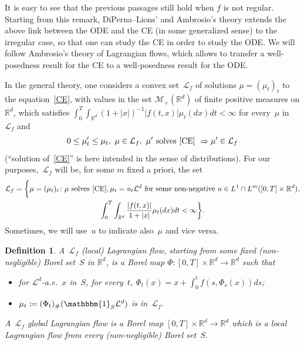 \documentclass[a4paper,10pt]{article}
\newtheorem{definition}[theorem]{Definition}
\newcommand\1{\mathbbm{1}}
\newcommand{\mc}{\mathcal}
\numberwithin{equation}{section}
\begin{document}
It is easy to see that the previous passages still hold when $f$ is not regular. Starting from this remark, DiPerna--Lions' and Ambrosio's theory extends the above link between the ODE and the CE (in some generalized sense) to the irregular case, so that one can study the CE in order to study the ODE. We will follow Ambrosio's theory of Lagrangian flows, which allows to transfer a well-posedness result for the CE to a well-posedness result for the ODE.

In the general theory, one considers a convex set~$\mc{L}_f$ of solutions $\mu=(\mu_t)_t$ to the equation~\eqref{CE}, with values in the set $\mc{M}_+(\mathbb{R}^d)$ of finite positive measures on $\mathbb{R}^d$, which satisfies $\int^T_0\int_{\mathbb{R}^d} (1+|x|)^{-1} |f(t,x)| \mu_t(dx)dt< \infty$ for every~$\mu$ in~$\mc{L}_f$ and
\begin{equation}
0\le\mu'_t\le\mu_t,\ \mu\in\mc{L}_f,\ \mu'\mbox{ solves~\eqref{CE} }\Rightarrow\mu'\in\mc{L}_f\label{condLb}
\end{equation}
(``solution of~\eqref{CE}'' is here intended in the sense of distributions). For our purposes,~$\mc{L}_f$ will be, for some $m$ fixed a priori, the set
\begin{multline*}
\mc{L}_f=\bigg\{\mu=(\mu_t)_t \colon \mu\mbox{ solves~\eqref{CE}}, \mu_t=u_t\mc{L}^d \text{ for some non-negative } u\in L^1\cap L^m([0,T]\times\mathbb{R}^d), \\ \int^T_0\int_{\mathbb{R}^d}\frac{|f(t,x)|}{1+|x|}\mu_t(dx)dt< \infty \bigg\} .
\end{multline*}
Sometimes, we will use~$u$ to indicate also~$\mu$ and vice versa.

\begin{definition}
A~\emph{$\mc{L}_f$ \textup{(}local\textup{)} Lagrangian flow, starting from some fixed \textup{(}non-negligible\textup{)} Borel set~$S$ in $\mathbb{R}^d$}, is a Borel map $\Phi \colon [0,T]\times\mathbb{R}^d\rightarrow\mathbb{R}^d$ such that
\begin{itemize}
\item for $\mc{L}^d$-a.e.~$x$ in~$S$, for every~$t$, $\Phi_t(x)=x+\int^t_0f(s,\Phi_s(x))ds$;
\item $\mu_t\coloneqq (\Phi_t)_\#( \1_{S} \mc{L}^d)$ is in~$\mc{L}_f$.
\end{itemize}
A~\emph{$\mc{L}_f$ global Lagrangian flow} is a Borel map $[0,T]\times\mathbb{R}^d\rightarrow\mathbb{R}^d$ which is a local Lagrangian flow from every \textup{(}non-negligible\textup{)} Borel set~$S$.
\end{definition}
\end{document}
